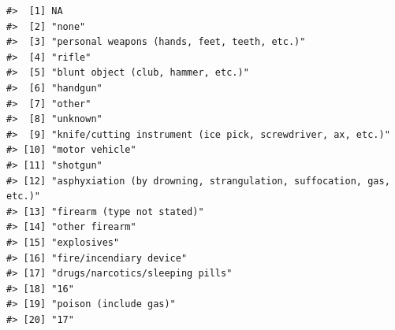 \documentclass[
]{krantz}
\begin{document}
\begin{verbatim}
#>  [1] NA                                                                 
#>  [2] "none"                                                             
#>  [3] "personal weapons (hands, feet, teeth, etc.)"                      
#>  [4] "rifle"                                                            
#>  [5] "blunt object (club, hammer, etc.)"                                
#>  [6] "handgun"                                                          
#>  [7] "other"                                                            
#>  [8] "unknown"                                                          
#>  [9] "knife/cutting instrument (ice pick, screwdriver, ax, etc.)"       
#> [10] "motor vehicle"                                                    
#> [11] "shotgun"                                                          
#> [12] "asphyxiation (by drowning, strangulation, suffocation, gas, etc.)"
#> [13] "firearm (type not stated)"                                        
#> [14] "other firearm"                                                    
#> [15] "explosives"                                                       
#> [16] "fire/incendiary device"                                           
#> [17] "drugs/narcotics/sleeping pills"                                   
#> [18] "16"                                                               
#> [19] "poison (include gas)"                                             
#> [20] "17"
\end{verbatim}
\end{document}

